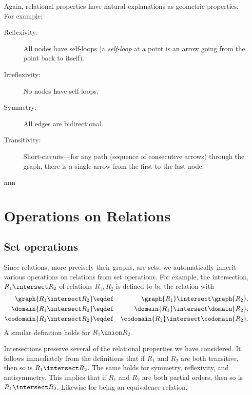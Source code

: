 Again, relational properties have natural explanations as geometric
properties.  For example:
\begin{description}

\item[Reflexivity:] 
All nodes have self-loops (a \emph{self-loop} at a point is an arrow
going from the point back to itself).

\item[Irreflexivity:] 
No nodes have self-loops.

\item[Symmetry:] 
All edges are bidirectional.

\item[Transitivity:] 
Short-circuits---for any path (sequence of consecutive arrows) through
the graph, there is a single arrow from the first to the last node.
\end{description}
nnn
\fi



\section{Operations on Relations}

\subsection{Set operations}
Since relations, more precisely their graphs, are sets, we automatically
inherit various operations on relations from set operations.  For example, 
the intersection, $R_1 \intersect R_2$ of relations $R_1, R_2$ is defined
to be the relation with
\begin{eqnarray*}
\graph{R_1 \intersect R_2} &\eqdef& \graph{R_1} \intersect \graph{R_2},\\
\domain{R_1 \intersect R_2} &\eqdef& \domain{R_1} \intersect
\domain{R_2},\\ \codomain{R_1 \intersect R_2} &\eqdef& \codomain{R_1}
\intersect \codomain{R_2}.
\end{eqnarray*}
A similar definition holds for $R_1 \union R_2$.

Intersections preserve several of the relational properties we have
considered.  It follows immediately from the definitions that if $R_1$ and
$R_2$ are both transitive, then so is $R_1 \intersect R_2$.  The same
holds for symmetry, reflexivity, and antisymmetry.  This implies that if
$R_1$ and $R_2$ are both partial orders, then so is $R_1 \intersect R_2$.
Likewise for being an equivalence relation.

